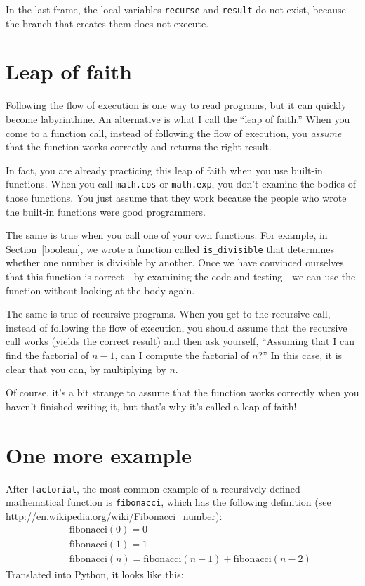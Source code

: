 \documentclass[10pt]{book}
\begin{document}
\begin{CJK}{UTF8}{gbsn}
In the last frame, the local
variables {\tt recurse} and {\tt result} do not exist, because
the branch that creates them does not execute.


\section{Leap of faith}

Following the flow of execution is one way to read programs, but
it can quickly become labyrinthine.  An
alternative is what I call the ``leap of faith.''  When you come to a
function call, instead of following the flow of execution, you {\em
assume} that the function works correctly and returns the right
result.

In fact, you are already practicing this leap of faith when you use
built-in functions.  When you call {\tt math.cos} or {\tt math.exp},
you don't examine the bodies of those functions.  You just
assume that they work because the people who wrote the built-in
functions were good programmers.

The same is true when you call one of your own functions.  For
example, in Section~\ref{boolean}, we wrote a function called 
\verb"is_divisible" that determines whether one number is divisible by
another.  Once we have convinced ourselves that this function is
correct---by examining the code and testing---we can use the function
without looking at the body again.

The same is true of recursive programs.  When you get to the recursive
call, instead of following the flow of execution, you should assume
that the recursive call works (yields the correct result) and then ask
yourself, ``Assuming that I can find the factorial of $n-1$, can I
compute the factorial of $n$?''  In this case, it is clear that you
can, by multiplying by $n$.

Of course, it's a bit strange to assume that the function works
correctly when you haven't finished writing it, but that's why
it's called a leap of faith!


\section{One more example}
\label{one.more.example}

After {\tt factorial}, the most common example of a recursively
defined mathematical function is {\tt fibonacci}, which has the
following definition (see
  \url{http://en.wikipedia.org/wiki/Fibonacci_number}):
%
\begin{eqnarray*}
&& \mathrm{fibonacci}(0) = 0 \\
&& \mathrm{fibonacci}(1) = 1 \\
&& \mathrm{fibonacci}(n) = \mathrm{fibonacci}(n-1) + \mathrm{fibonacci}(n-2)
\end{eqnarray*}
%
Translated into Python, it looks like this:


\end{CJK}
\end{document}
